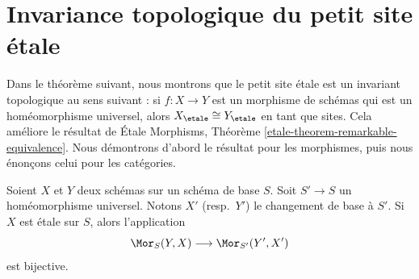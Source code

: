 \section{Invariance topologique du petit site \'etale}
\label{section-topological-invariance}

\noindent
Dans le th\'eor\`eme suivant, nous montrons que le petit site \'etale est un invariant
topologique au sens suivant : si $f : X \to Y$ est un morphisme de sch\'emas
qui est un hom\'eomorphisme universel, alors $X_\etale \cong Y_\etale$
en tant que sites. Cela am\'eliore le r\'esultat de
\'Etale Morphisms, Th\'eor\`eme \ref{etale-theorem-remarkable-equivalence}.
Nous d\'emontrons d'abord le r\'esultat pour les morphismes, puis nous \'enon\c{c}ons celui
pour les cat\'egories.

\begin{theorem}
\label{theorem-etale-topological}
Soient $X$ et $Y$ deux sch\'emas sur un sch\'ema de base $S$. Soit
$S' \to S$ un hom\'eomorphisme universel.
Notons $X'$ (resp.\ $Y'$) le changement de base \`a $S'$.
Si $X$ est \'etale sur $S$, alors l'application
$$
\Mor_S(Y, X) \longrightarrow \Mor_{S'}(Y', X')
$$
est bijective.
\end{theorem}

